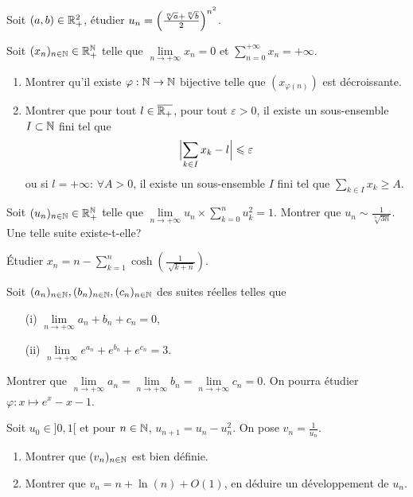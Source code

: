 \documentclass[12pt]{article}
\begin{document}
\begin{exercise}
	Soit $(a,b)\in\mathbb{R}_{+}^{2}$, étudier
	$u_{n}=\Bigl(\frac{\sqrt[n]{a}+\sqrt[n]{b}}{2}\Bigr)^{n^{2}}$.
\end{exercise}

\begin{exercise}
	Soit $(x_{n})_{n\in\mathbb{N}}\in\mathbb{R}_{+}^{\mathbb{N}}$ telle que $\lim\limits_{n\to+\infty}x_n=0$
	et $\sum_{n=0}^{+\infty}x_{n}=+\infty$.
	\begin{enumerate}
		\item
		Montrer qu'il existe $\varphi:\mathbb{N}\to\mathbb{N}$ bijective telle que
		$(x_{\varphi(n)})$ est décroissante.
		\item
		Montrer que pour tout $l\in\overline{\mathbb{R}_{+}}$, pour tout $\varepsilon>0$,
		il existe un sous-ensemble $I\subset\mathbb{N}$ fini tel que
		$$\Bigl\vert\sum_{k\in I}x_{k}-l\Bigr\vert\leqslant\varepsilon$$ ou si
		$l=+\infty$: $\forall A>0$, il existe un sous-ensemble $I$ fini tel que
		$\sum_{k\in I}x_{k}\geqslant A$.
	\end{enumerate}
\end{exercise}

\begin{exercise}
	Soit $(u_{n})_{n\in\mathbb{N}}\in\mathbb{R}_{+}^{\mathbb{N}}$ telle que
	$\lim\limits_{n\to+\infty}u_{n}\times\sum_{k=0}^{n}u_{k}^{2}=1$. Montrer que
	$u_{n}\sim\frac{1}{\sqrt[3]{3n}}$. Une telle suite existe-t-elle?
\end{exercise}

\begin{exercise}
	Étudier $x_{n}=n-\sum_{k=1}^{n}\cosh(\frac{1}{\sqrt[]{k+n}})$.
\end{exercise}

\begin{exercise}
	Soit $(a_{n})_{n\in\mathbb{N}},(b_{n})_{n\in\mathbb{N}},(c_{n})_{n\in\mathbb{N}}$ des suites réelles
	telles que 
	\begin{enumerate}
		\item
		[(i)] $\lim\limits_{n\to+\infty}a_{n}+b_{n}+c_{n}=0$,
		\item [(ii)]
		$\lim\limits_{n\to+\infty}e^{a_{n}}+e^{b_{n}}+e^{c_{n}}=3$.
	\end{enumerate}
	Montrer que
	$\lim\limits_{n\to+\infty}a_{n}=\lim\limits_{n\to+\infty}b_{n}=\lim\limits_{n\to+\infty}c_{n}=0$.
	On pourra étudier $\varphi:x\mapsto e^{x}-x-1$.
\end{exercise}

\begin{exercise}
	Soit $u_{0}\in]0,1[$ et pour $n\in\mathbb{N}$, $u_{n+1}=u_{n}-u_{n}^{2}$. On pose
	$v_{n}=\frac{1}{u_{n}}$.
	\begin{enumerate}
		\item
		Montrer que $(v_{n})_{n\in\mathbb{N}}$ est bien définie.
		\item
		Montrer que $v_{n}=n+\ln(n)+O(1)$, en déduire un développement de $u_{n}$.
	\end{enumerate}
\end{exercise}
\end{document}
